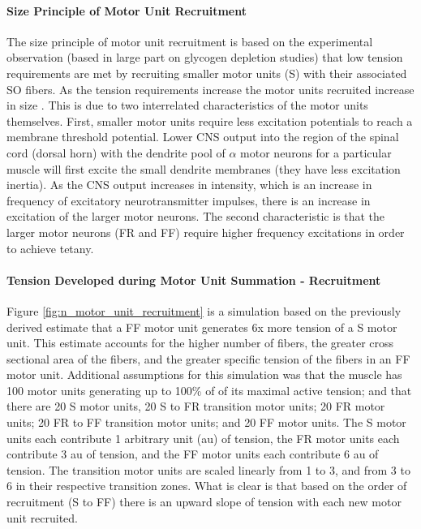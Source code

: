 \paragraph{Size Principle of Motor Unit Recruitment}

The size principle of motor unit recruitment is based on the experimental observation (based in large part on glycogen depletion studies) that low tension requirements are met by recruiting smaller motor units (S) with their associated SO fibers. As the tension requirements increase the motor units recruited increase in size \cite{henneman_rank_1974}. This is due to two interrelated characteristics of the motor units themselves. First, smaller motor units require less excitation potentials to reach a membrane threshold potential. Lower CNS output into the region of the spinal cord (dorsal horn) with the dendrite pool of $\alpha$ motor neurons for a particular muscle will first excite the small dendrite membranes (they have less excitation inertia). As the CNS output increases in intensity, which is an increase in frequency of excitatory neurotransmitter impulses, there is an increase in excitation of the larger motor neurons. The second characteristic is that the larger motor neurons (FR and FF) require higher frequency excitations in order to achieve tetany.

\paragraph{Tension Developed during Motor Unit Summation - Recruitment}

Figure \ref{fig:n_motor_unit_recruitment} is a simulation based on the previously derived estimate that a FF motor unit generates 6x more tension of a S motor unit. This estimate accounts for the higher number of fibers, the greater cross sectional area of the fibers, and the greater specific tension of the fibers in an FF motor unit. Additional assumptions for this simulation was that the muscle has 100 motor units generating up to 100\% of of its maximal active tension; and that there are 20 S motor units, 20 S to FR transition motor units; 20 FR motor units; 20 FR to FF transition motor units; and 20 FF motor units. The S motor units each contribute 1 arbitrary unit (au) of tension, the FR motor units each contribute 3 au of tension, and the FF motor units each contribute 6 au of tension. The transition motor units are scaled linearly from 1 to 3, and from 3 to 6 in their respective transition zones. What is clear is that based on the order of recruitment (S to FF) there is an upward slope of tension with each new motor unit recruited.

